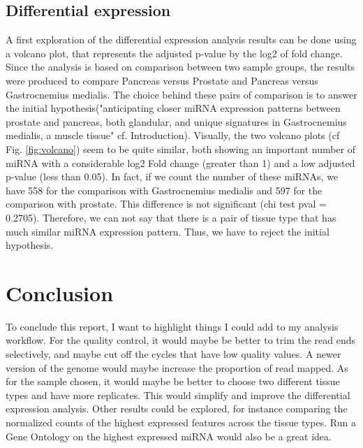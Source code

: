 \documentclass[a4paper, 11pt]{article}
\begin{document}
\begin{multicols}{2}
\subsection{Differential expression}
A first exploration of the differential expression analysis results can be done using a volcano plot, that represents the adjusted p-value by the log2 of fold change. Since the analysis is based on comparison between two sample groups, the results were produced to compare Pancreas versus Prostate and Pancreas versus Gastrocnemius medialis. The choice behind these pairs of comparison is to answer the initial hypothesis("anticipating closer miRNA expression patterns between prostate and pancreas, both glandular, and unique signatures in Gastrocnemius medialis, a muscle tissue" cf. Introduction). Visually, the two volcano plots (cf Fig. \ref{fig:volcano}) seem to be quite similar, both showing an important number of miRNA with a considerable log2 Fold change (greater than 1) and a low adjusted p-value (less than 0.05). In fact, if we count the number of these miRNAs, we have 558 for the comparison with Gastrocnemius medialis and 597 for the comparison with prostate. This difference is not significant (chi test pval = 0.2705). Therefore, we can not say that there is a pair of tissue type that has much similar miRNA expression pattern. Thus, we have to reject the initial hypothesis.

\section{Conclusion}

To conclude this report, I want to highlight things I could add to my analysis workflow. 
For the quality control, it would maybe be better to trim the read ends selectively, and maybe cut off the cycles that have low quality values. A newer version of the genome would maybe increase the proportion of read mapped. As for the sample chosen, it would maybe be better to choose two different tissue types and have more replicates. This would simplify and improve the differential expression analysis. Other results could be explored, for instance comparing the normalized counts of the highest expressed features across the tissue types. Run a Gene Ontology on the highest expressed miRNA would also be a great idea.


\end{multicols}
\end{document}
